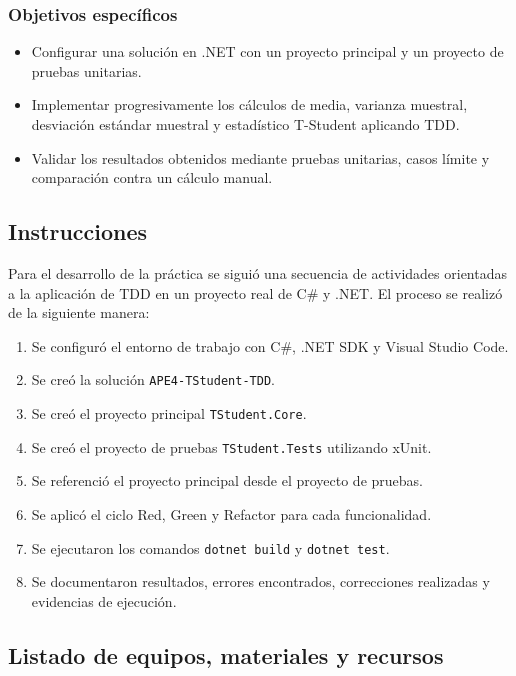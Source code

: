 \documentclass[12pt]{article}
\begin{document}
\subsubsection{Objetivos específicos}

\begin{itemize}
    \item Configurar una solución en .NET con un proyecto principal y un proyecto de pruebas unitarias.
    \item Implementar progresivamente los cálculos de media, varianza muestral, desviación estándar muestral y estadístico T-Student aplicando TDD.
    \item Validar los resultados obtenidos mediante pruebas unitarias, casos límite y comparación contra un cálculo manual.
\end{itemize}

\subsection{Instrucciones}

Para el desarrollo de la práctica se siguió una secuencia de actividades orientadas a la aplicación de TDD en un proyecto real de C\# y .NET. El proceso se realizó de la siguiente manera:

\begin{enumerate}
    \item Se configuró el entorno de trabajo con C\#, .NET SDK y Visual Studio Code.
    \item Se creó la solución \texttt{APE4-TStudent-TDD}.
    \item Se creó el proyecto principal \texttt{TStudent.Core}.
    \item Se creó el proyecto de pruebas \texttt{TStudent.Tests} utilizando xUnit.
    \item Se referenció el proyecto principal desde el proyecto de pruebas.
    \item Se aplicó el ciclo Red, Green y Refactor para cada funcionalidad.
    \item Se ejecutaron los comandos \texttt{dotnet build} y \texttt{dotnet test}.
    \item Se documentaron resultados, errores encontrados, correcciones realizadas y evidencias de ejecución.
\end{enumerate}

\subsection{Listado de equipos, materiales y recursos}
\end{document}
